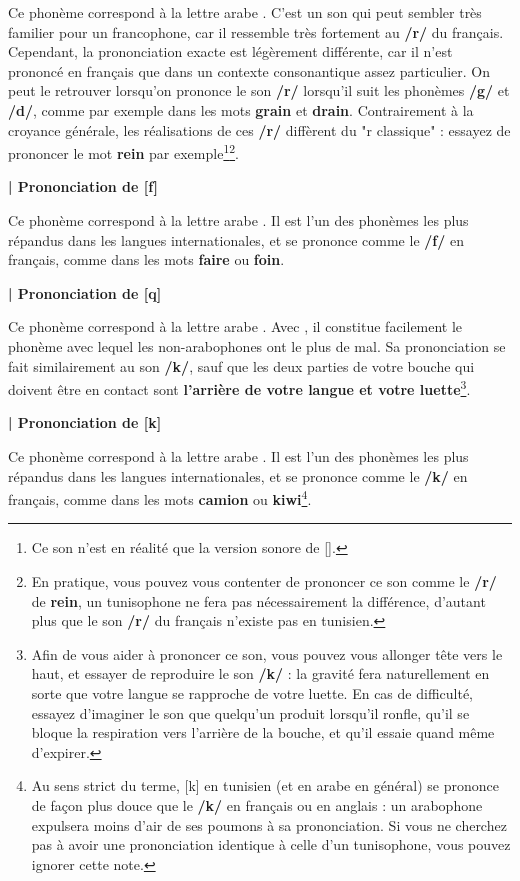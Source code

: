 Ce phonème correspond à la lettre arabe . C'est un son qui peut sembler très familier pour un francophone, car il ressemble très fortement au \textbf{/r/} du français. Cependant, la prononciation exacte est légèrement différente, car il n'est prononcé en français que dans un contexte consonantique assez particulier. On peut le retrouver lorsqu'on prononce le son \textbf{/r/} lorsqu'il suit les phonèmes \textbf{/g/} et \textbf{/d/}, comme par exemple dans les mots \textbf{grain} et \textbf{drain}. Contrairement à la croyance générale, les réalisations de ces \textbf{/r/} diffèrent du "r classique" : essayez de prononcer le mot \textbf{rein} par exemple\footnote{Ce son n'est en réalité que la version sonore de  [\textchi].}\footnote{En pratique, vous pouvez vous contenter de prononcer ce son comme le \textbf{/r/} de \textbf{rein}, un tunisophone ne fera pas nécessairement la différence, d'autant plus que le son \textbf{/r/} du français n'existe pas en tunisien.}.

\textbf{| Prononciation de   [f]}

Ce phonème correspond à la lettre arabe . Il est l'un des phonèmes les plus répandus dans les langues internationales, et se prononce comme le \textbf{/f/} en français, comme dans les mots \textbf{faire} ou \textbf{foin}.


\textbf{| Prononciation de   [q]}

Ce phonème correspond à la lettre arabe . Avec , il constitue facilement le phonème avec lequel les non-arabophones ont le plus de mal. Sa prononciation se fait similairement au son \textbf{/k/}, sauf que les deux parties de votre bouche qui doivent être en contact sont \textbf{l'arrière de votre langue et votre luette}\footnote{Afin de vous aider à prononcer ce son, vous pouvez vous allonger tête vers le haut, et essayer de reproduire le son \textbf{/k/} : la gravité fera naturellement en sorte que votre langue se rapproche de votre luette. En cas de difficulté, essayez d'imaginer le son que quelqu'un produit lorsqu'il ronfle, qu'il se bloque la respiration vers l'arrière de la bouche, et qu'il essaie quand même d'expirer.}.


\textbf{| Prononciation de   [k]}

Ce phonème correspond à la lettre arabe . Il est l'un des phonèmes les plus répandus dans les langues internationales, et se prononce comme le \textbf{/k/} en français, comme dans les mots \textbf{camion} ou \textbf{kiwi}\footnote{Au sens strict du terme,  [k] en tunisien (et en arabe en général) se prononce de façon plus douce que le \textbf{/k/} en français ou en anglais : un arabophone expulsera moins d'air de ses poumons à sa prononciation. Si vous ne cherchez pas à avoir une prononciation identique à celle d'un tunisophone, vous pouvez ignorer cette note.}.


